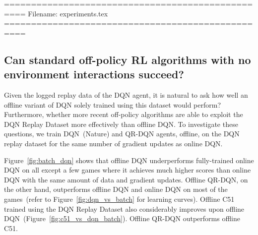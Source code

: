 \newcommand{\laplace}{\mathrm{Laplace}} %

\newcommand{\Ls}{\mathcal{L}}
\newcommand{\emp}{\tilde{p}}
\newcommand{\lr}{\alpha}
\newcommand{\reg}{\lambda}
\newcommand{\rect}{\mathrm{rectifier}}
\newcommand{\softmax}{\mathrm{softmax}}
\newcommand{\sigmoid}{\sigma}
\newcommand{\softplus}{\zeta}
\newcommand{\KL}{D_{\mathrm{KL}}}
\newcommand{\Var}{\mathrm{Var}}
\newcommand{\standarderror}{\mathrm{SE}}
\newcommand{\Cov}{\mathrm{Cov}}
\newcommand{\normlzero}{L^0}
\newcommand{\normlone}{L^1}
\newcommand{\normltwo}{L^2}
\newcommand{\normlp}{L^p}
\newcommand{\normmax}{L^\infty}

\newcommand{\parents}{Pa} %

\DeclareMathOperator{\sign}{sign}
\DeclareMathOperator{\Tr}{Tr}
\let\ab\allowbreak

\def\ww{\hspace*{.075cm}}
\def\www{\hspace*{.4cm}}
\newcommand{\script}[1]{\scriptsize {(#1)}}


\def\etal{{et al.}\xspace}



==================================================
Filename: experiments.tex
==================================================
\subsection{Can standard off-policy RL algorithms with no environment interactions succeed?}\label{sec:part1_experiments}

Given the logged replay data of the DQN agent, it is natural to ask
how well an offline variant of DQN solely trained using this dataset
would perform?
Furthermore, whether more recent
off-policy algorithms are able to exploit the DQN Replay Dataset more
effectively than offline DQN. To investigate these questions, we train
DQN~(Nature) and QR-DQN agents, offline, on the DQN
replay dataset for the same number of gradient updates as online DQN.

Figure~\ref{fig:batch_dqn} shows that offline DQN underperforms fully-trained online DQN on
all except a few games where it achieves much higher scores than
online DQN with the same amount of data and gradient updates.
Offline QR-DQN, on the other hand, outperforms offline DQN and online DQN on most of the
games~(refer to Figure~\ref{fig:dqn_vs_batch} for learning curves).
Offline C51 trained using the DQN Replay Dataset also considerably improves upon offline
DQN~(Figure~\ref{fig:c51_vs_dqn_batch}). Offline QR-DQN outperforms offline C51. 

